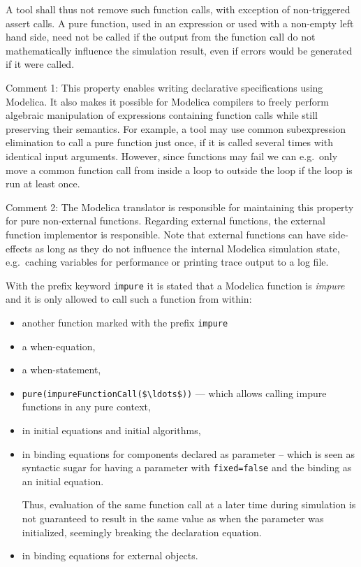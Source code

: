 \begin{nonnormative}
A tool shall thus not remove such function calls, with exception of non-triggered assert calls.  A pure function, used in an expression or used with
a non-empty left hand side, need not be called if the output from the function call do not mathematically influence the simulation result, even if
errors would be generated if it were called.
\end{nonnormative}

\begin{nonnormative}
Comment 1: This property enables writing declarative
specifications using Modelica. It also makes it possible for Modelica
compilers to freely perform algebraic manipulation of expressions
containing function calls while still preserving their semantics. For
example, a tool may use common subexpression elimination to call a pure
function just once, if it is called several times with identical input
arguments. However, since functions may fail we can e.g.\ only move a
common function call from inside a loop to outside the loop if the loop
is run at least once.
\end{nonnormative}

\begin{nonnormative}
Comment 2: The Modelica translator is responsible for
maintaining this property for pure non-external functions. Regarding
external functions, the external function implementor is responsible.
Note that external functions can have side-effects as long as they do
not influence the internal Modelica simulation state, e.g.\ caching
variables for performance or printing trace output to a log file.
\end{nonnormative}

With the prefix keyword \lstinline!impure! it is stated that a Modelica
function is \emph{impure} and it is only allowed to call such a function
from within:
\begin{itemize}
\item
  another function marked with the prefix \lstinline!impure!
\item
  a when-equation,
\item
  a when-statement,
\item
  \lstinline[mathescape=true]!pure(impureFunctionCall($\ldots$))! --- which allows calling impure
  functions in any pure context,
\item
  in initial equations and initial algorithms,
\item
  in binding equations for components declared as parameter -- which is seen as
  syntactic sugar for having a parameter with \lstinline!fixed=false! and the
  binding as an initial equation.
  \begin{nonnormative}
  Thus, evaluation of the same function call at a later time during simulation is not guaranteed to result in the same value as when the parameter
  was initialized, seemingly breaking the declaration equation.
  \end{nonnormative}
\item
  in binding equations for external objects.
\end{itemize}

